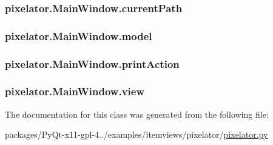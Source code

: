\subsubsection[{current\+Path}]{\setlength{\rightskip}{0pt plus 5cm}pixelator.\+Main\+Window.\+current\+Path}\label{classpixelator_1_1MainWindow_ad8d8eaa2a04f42b773793203b023a5b3}
\hypertarget{classpixelator_1_1MainWindow_a525153be9ef359d2bad5b32c1d893ba5}{}
\subsubsection[{model}]{\setlength{\rightskip}{0pt plus 5cm}pixelator.\+Main\+Window.\+model}\label{classpixelator_1_1MainWindow_a525153be9ef359d2bad5b32c1d893ba5}
\hypertarget{classpixelator_1_1MainWindow_a48c84237717e7b691ff9033532e6d7ad}{}
\subsubsection[{print\+Action}]{\setlength{\rightskip}{0pt plus 5cm}pixelator.\+Main\+Window.\+print\+Action}\label{classpixelator_1_1MainWindow_a48c84237717e7b691ff9033532e6d7ad}
\hypertarget{classpixelator_1_1MainWindow_a54e84915aee591cc6751a35bae271806}{}
\subsubsection[{view}]{\setlength{\rightskip}{0pt plus 5cm}pixelator.\+Main\+Window.\+view}\label{classpixelator_1_1MainWindow_a54e84915aee591cc6751a35bae271806}


The documentation for this class was generated from the following file\+:\begin{DoxyCompactItemize}
\item 
packages/\+Py\+Qt-\/x11-\/gpl-\/4../examples/itemviews/pixelator/\hyperlink{pixelator_8py}{pixelator.\+py}\end{DoxyCompactItemize}
